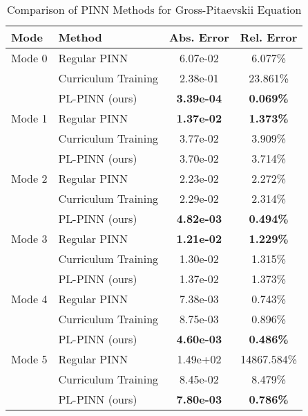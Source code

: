 \begin{table}[htbp]
\centering
\caption{Comparison of PINN Methods for Gross-Pitaevskii Equation}
\label{tab:pinn_comparison}
\begin{tabular}{llcc}
\toprule
Mode & Method & Abs. Error & Rel. Error \\
\midrule
Mode 0 & Regular PINN & 6.07e-02 & 6.077\% \\
 & Curriculum Training & 2.38e-01 & 23.861\% \\
 & PL-PINN (ours) & \textbf{3.39e-04} & \textbf{0.069\%} \\
\midrule
Mode 1 & Regular PINN & \textbf{1.37e-02} & \textbf{1.373\%} \\
 & Curriculum Training & 3.77e-02 & 3.909\% \\
 & PL-PINN (ours) & 3.70e-02 & 3.714\% \\
\midrule
Mode 2 & Regular PINN & 2.23e-02 & 2.272\% \\
 & Curriculum Training & 2.29e-02 & 2.314\% \\
 & PL-PINN (ours) & \textbf{4.82e-03} & \textbf{0.494\%} \\
\midrule
Mode 3 & Regular PINN & \textbf{1.21e-02} & \textbf{1.229\%} \\
 & Curriculum Training & 1.30e-02 & 1.315\% \\
 & PL-PINN (ours) & 1.37e-02 & 1.373\% \\
\midrule
Mode 4 & Regular PINN & 7.38e-03 & 0.743\% \\
 & Curriculum Training & 8.75e-03 & 0.896\% \\
 & PL-PINN (ours) & \textbf{4.60e-03} & \textbf{0.486\%} \\
\midrule
Mode 5 & Regular PINN & 1.49e+02 & 14867.584\% \\
 & Curriculum Training & 8.45e-02 & 8.479\% \\
 & PL-PINN (ours) & \textbf{7.80e-03} & \textbf{0.786\%} \\
\bottomrule
\end{tabular}
\end{table}
